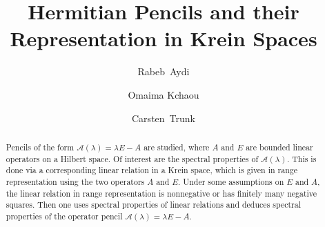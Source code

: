 \documentclass{birkjour}
\theoremstyle{definition}
\theoremstyle{remark}
\numberwithin{equation}{section}
\begin{document}
%
%
%
%
%
%
%
%
%


\title[Hermitian Pencils and their Representation]
 {Hermitian Pencils and their Representation in Krein Spaces}




\author{Rabeb~Aydi}

\address{%
University of Sfax, Department of Mathematics\\
BP1171, Sfax 3000\\
Tunisia}

\author{Omaima Kchaou}

\address{%
University of Sfax, Department of Mathematics\\
BP1171, Sfax 3000\\
Tunisia}


\author{Carsten~Trunk}
\address{Institute of Mathematics, , TU Ilmenau\br
 Weimarer Straße 25, 98693 Ilmenau\br
Germany}




\begin{abstract}
Pencils of the form  $\mathcal{A}(\lambda)=\lambda E-A$ are studied, where 
$A$ and $E$ are bounded linear operators on a Hilbert space. 
Of interest are the spectral properties of $\mathcal{A}(\lambda)$. This is done via a  corresponding linear relation in a Krein space, which is given in range representation using the two operators $A$ and $E$.
Under some assumptions on $E$ and $A$, the linear relation in range representation is nonnegative or has finitely many negative squares. Then one uses  spectral properties of
linear relations and deduces spectral properties of the operator pencil
$\mathcal{A}(\lambda)=\lambda E-A$.
\end{abstract}
\maketitle
\end{document}
